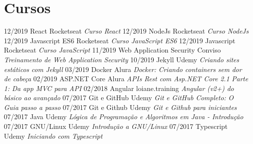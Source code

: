 \documentclass[]{friggeri-cv}
\begin{document}
\section{Cursos}
\begin{entrylist}
  \entry
    {12/2019}
    {React}
    {Rocketseat}
    {\emph{Curso React}}
  \entry
    {12/2019}
    {NodeJs}
    {Rocketseat}
    {\emph{Curso NodeJs}}
  \entry
    {12/2019}
    {Javascript ES6}
    {Rocketseat}
    {\emph{Curso JavaScript ES6}}
  \entry
    {12/2019}
    {Javascript}
    {Rocketseat}
    {\emph{Curso JavaScript}}
  \entry
    {11/2019}
    {Web Application Security}
    {Conviso}
    {\emph{Treinamento de Web Application Security}}
  \entry
    {10/2019}
    {Jekyll}
    {Udemy}
    {\emph{Criando sites estáticos com Jekyll}}
  \entry
    {03/2019}
    {Docker}
    {Alura}
    {\emph{Docker: Criando containers sem dor de cabeça}}
  \entry
    {02/2019}
    {ASP.NET Core}
    {Alura}
    {\emph{APIs Rest com Asp.NET Core 2.1 Parte 1: Da app MVC para API}}
  \entry
    {02/2018}
    {Angular}
    {loiane.training}
    {\emph{Angular (v2+) do básico ao avançado}}
 \entry
    {07/2017}
    {Git e GitHub}
    {Udemy}
    {\emph{Git e GitHub Completo: O Guia passo a passo}}
 \entry
    {07/2017}
    {Git e Github}
    {Udemy}
    {\emph{Git e Github para iniciantes}}
 \entry
    {07/2017}
    {Java}
    {Udemy}
    {\emph{Lógica de Programação e Algoritmos em Java - Introdução}}
  \entry
    {07/2017}
    {GNU/Linux}
    {Udemy}
    {\emph{Introdução a GNU/Linux}}
  \entry
    {07/2017}
    {Typescript}
    {Udemy}
    {\emph{Iniciando com Typescript}}
\end{entrylist}


\end{document}
